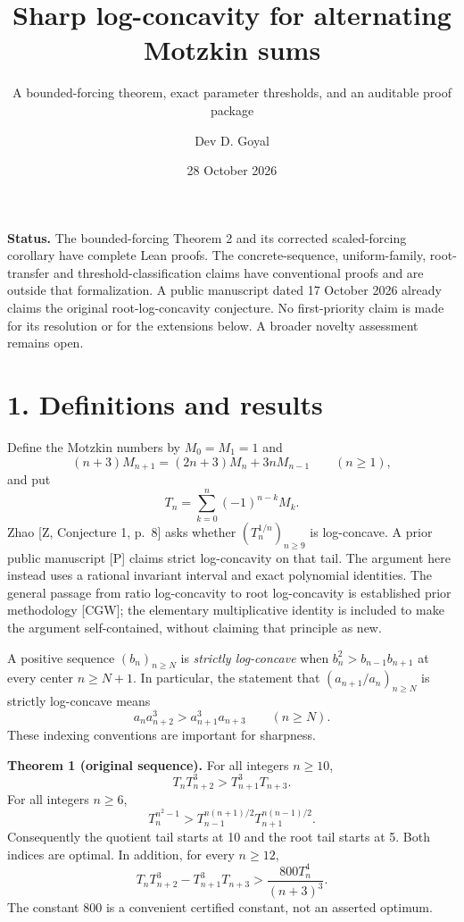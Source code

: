 \documentclass[
  11pt,
  a4paper,
]{article}
\title{Sharp log-concavity for alternating Motzkin sums}
\subtitle{A bounded-forcing theorem, exact parameter thresholds, and an
auditable proof package}
\author{Dev D. Goyal}
\date{28 October 2026}
\begin{document}
\maketitle

\par{}

\textbf{Status.} The bounded-forcing Theorem 2 and its corrected
scaled-forcing corollary have complete Lean proofs. The
concrete-sequence, uniform-family, root-transfer and
threshold-classification claims have conventional proofs and are outside
that formalization. A public manuscript dated 17 October 2026 already
claims the original root-log-concavity conjecture. No first-priority
claim is made for its resolution or for the extensions below. A broader
novelty assessment remains open.

\section{1. Definitions and results}\label{definitions-and-results}

Define the Motzkin numbers by \(M_0=M_1=1\) and \[
(n+3)M_{n+1}=(2n+3)M_n+3nM_{n-1}\qquad(n\ge1),
\] and put \[
T_n=\sum_{k=0}^n(-1)^{n-k}M_k.
\] Zhao {[}Z, Conjecture 1, p.~8{]} asks whether \((T_n^{1/n})_{n\ge9}\)
is log-concave. A prior public manuscript {[}P{]} claims strict
log-concavity on that tail. The argument here instead uses a rational
invariant interval and exact polynomial identities. The general passage
from ratio log-concavity to root log-concavity is established prior
methodology {[}CGW{]}; the elementary multiplicative identity is
included to make the argument self-contained, without claiming that
principle as new.

A positive sequence \((b_n)_{n\ge N}\) is \emph{strictly log-concave}
when \(b_n^2>b_{n-1}b_{n+1}\) at every center \(n\ge N+1\). In
particular, the statement that \((a_{n+1}/a_n)_{n\ge N}\) is strictly
log-concave means \[
a_na_{n+2}^3>a_{n+1}^3a_{n+3}\qquad(n\ge N).
\] These indexing conventions are important for sharpness.

\textbf{Theorem 1 (original sequence).} For all integers \(n\ge10\), \[
T_nT_{n+2}^{3}>T_{n+1}^{3}T_{n+3}.
\tag{1}
\] For all integers \(n\ge6\), \[
T_n^{n^2-1}>
T_{n-1}^{n(n+1)/2}T_{n+1}^{n(n-1)/2}.
\tag{2}
\] Consequently the quotient tail starts at 10 and the root tail starts
at 5. Both indices are optimal. In addition, for every \(n\ge12\), \[
T_nT_{n+2}^{3}-T_{n+1}^{3}T_{n+3}
>\frac{800T_n^4}{(n+3)^3}.
\tag{3}
\] The constant 800 is a convenient certified constant, not an asserted
optimum.
\end{document}
